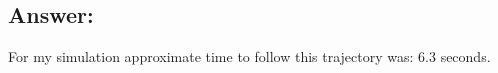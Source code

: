 \documentclass{article}
\begin{document}
\begin{center}
\end{center}

\subsection*{Answer:}

\begin{answer}
      For my simulation approximate time to follow this trajectory was: 6.3 seconds.
\end{answer}
\end{document}
